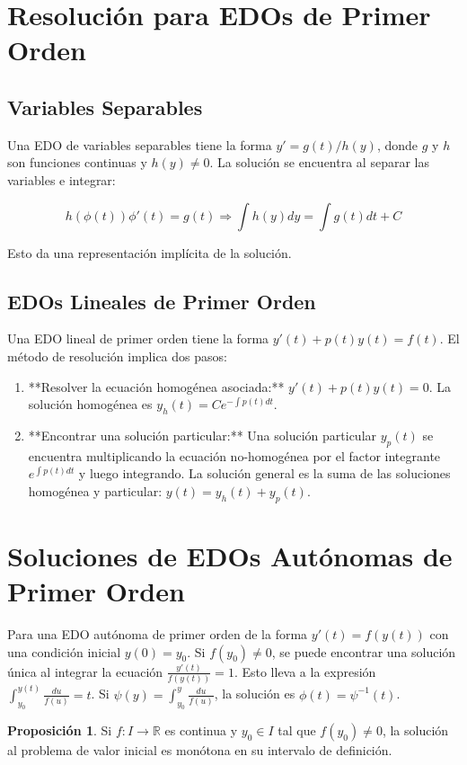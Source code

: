 \documentclass[11pt]{article}
\theoremstyle{definition} %
\newtheorem{proposition}[theorem]{Proposición}
\begin{document}
\section{Resolución para EDOs de Primer Orden}
\label{sec:resolucion-explícita}

\subsection{Variables Separables}
Una EDO de variables separables tiene la forma $y' = g(t)/h(y)$, donde $g$ y $h$ son funciones continuas y $h(y) \ne 0$. La solución se encuentra al separar las variables e integrar:

\[
  h(\phi(t))\phi'(t) = g(t) \Rightarrow \int h(y)dy = \int g(t)dt + C
\]

Esto da una representación implícita de la solución.

\subsection{EDOs Lineales de Primer Orden}
Una EDO lineal de primer orden tiene la forma $y'(t) + p(t)y(t) = f(t)$. El método de resolución implica dos pasos:

\begin{enumerate}
    \item **Resolver la ecuación homogénea asociada:** $y'(t) + p(t)y(t) = 0$. La solución homogénea es $y_h(t) = Ce^{-\int p(t)dt}$.
    \item **Encontrar una solución particular:** Una solución particular $y_p(t)$ se encuentra multiplicando la ecuación no-homogénea por el factor integrante $e^{\int p(t)dt}$ y luego integrando. La solución general es la suma de las soluciones homogénea y particular: $y(t) = y_h(t) + y_p(t)$.
\end{enumerate}

\section{Soluciones de EDOs Autónomas de Primer Orden}
\label{sec:soluciones-autonomas}
Para una EDO autónoma de primer orden de la forma $y'(t) = f(y(t))$ con una condición inicial $y(0) = y_0$. Si $f(y_0) \ne 0$, se puede encontrar una solución única al integrar la ecuación $\frac{y'(t)}{f(y(t))} = 1$. Esto lleva a la expresión $\int_{y_0}^{y(t)} \frac{du}{f(u)} = t$. Si $\psi(y) = \int_{y_0}^{y} \frac{du}{f(u)}$, la solución es $\phi(t) = \psi^{-1}(t)$.
\begin{proposition}
Si $f: I \rightarrow \mathbb{R}$ es continua y $y_0 \in I$ tal que $f(y_0) \ne 0$, la solución al problema de valor inicial es monótona en su intervalo de definición.
\end{proposition}
\end{document}
